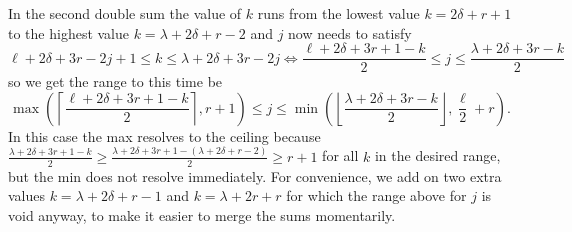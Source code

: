 In the second double sum the value of $k$ runs from the lowest
value $k = 2 \delta + r + 1$ to the highest value $k = \lambda + 2 \delta + r - 2$
and $j$ now needs to satisfy
\[ \ell + 2 \delta + 3r - 2j + 1 \le k \le \lambda + 2\delta + 3r - 2j
  \iff \frac{\ell+2\delta+3r+1-k}{2} \le j \le \frac{\lambda+2\delta+3r-k}{2} \]
so we get the range to this time be
\[ \max\left( \left\lceil \frac{\ell + 2\delta + 3r + 1 - k}{2} \right\rceil, r + 1\right)
  \le j \le \min\left( \left\lfloor \frac{\lambda+2\delta+3r-k}{2} \right\rfloor,
    \frac{\ell}{2} + r \right). \]
In this case the max resolves to the ceiling because
$\frac{\lambda + 2 \delta + 3r + 1 - k}{2}
\ge \frac{\lambda + 2 \delta + 3r + 1 - (\lambda + 2 \delta + r - 2)}{2} \ge r+1$
for all $k$ in the desired range, but the min does not resolve immediately.
For convenience, we add on two extra values $k = \lambda + 2 \delta + r - 1$
and $k = \lambda + 2r + r$ for which the range above for $j$ is void anyway,
to make it easier to merge the sums momentarily.

